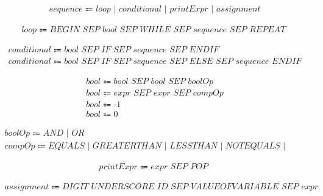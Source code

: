 \documentclass[a4paper,12pt]{article}
\begin{document}
\begin{landscape}
\begin{equation} 
\begin{aligned}
    \textit{sequence } \Coloneqq \textit{ loop | conditional | printExpr | assignment}
\end{aligned}
\end{equation}

\begin{equation} 
\begin{aligned}
    \textit{loop } \Coloneqq \textit{ BEGIN SEP bool SEP WHILE SEP sequence SEP REPEAT }
\end{aligned}
\end{equation}

\begin{equation} 
\begin{aligned}
    \textit{conditional } \Coloneqq \textit{ bool SEP IF SEP sequence SEP ENDIF}\\
    \textit{conditional } \Coloneqq \textit{ bool SEP IF SEP sequence SEP ELSE SEP sequence ENDIF}
\end{aligned}
\end{equation}

\begin{equation} 
\begin{aligned}
    \textit{bool } \Coloneqq \textit{ bool SEP bool SEP boolOp}\\
    \textit{bool } \Coloneqq \textit{ expr SEP expr SEP compOp}\\
    \textit{bool } \Coloneqq \textit{ -1}\\
    \textit{bool } \Coloneqq \textit{ 0}
\end{aligned}
\end{equation}

\begin{equation} 
\begin{aligned}
    \textit{boolOp } \Coloneqq \textit{ AND | OR}\\
    \textit{compOp } \Coloneqq \textit{ EQUALS | GREATERTHAN | LESSTHAN | NOTEQUALS | LESSTHANOREQUALS}
\end{aligned}
\end{equation}

\begin{equation} 
\begin{aligned}
    \textit{printExpr } \Coloneqq \textit{ expr SEP POP }
\end{aligned}
\end{equation}

\begin{equation} 
\begin{aligned}
    \textit{assignment } \Coloneqq \textit{ DIGIT UNDERSCORE ID SEP VALUEOFVARIABLE SEP expr}
\end{aligned}
\end{equation}


\end{landscape}
\end{document}
